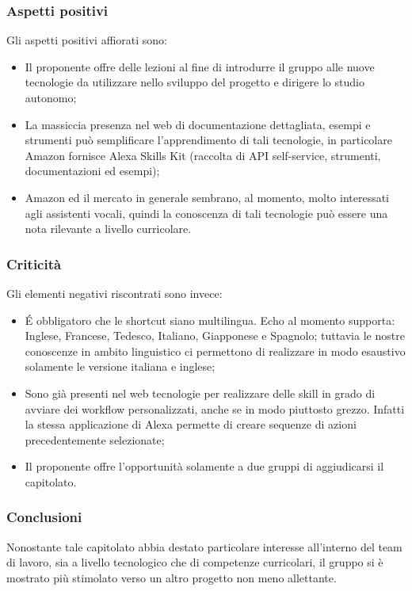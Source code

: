 \subsubsection{Aspetti positivi}
Gli aspetti positivi affiorati sono:
\begin{itemize}
    \item Il proponente offre delle lezioni al fine di introdurre il gruppo alle 
nuove tecnologie da utilizzare nello sviluppo del progetto e dirigere lo studio 
autonomo;
    \item La massiccia presenza nel web di documentazione dettagliata, esempi e 
strumenti può semplificare l'apprendimento di tali tecnologie, in 
particolare Amazon fornisce Alexa Skills Kit (raccolta di API self-service, 
strumenti, documentazioni ed esempi);
    \item Amazon ed il mercato in generale sembrano, al momento, molto interessati 
agli assistenti vocali, quindi la conoscenza di tali tecnologie può essere una 
nota rilevante a livello curricolare.
\end{itemize}
\subsubsection{Criticità}
Gli elementi negativi riscontrati sono invece:
\begin{itemize}
    \item É obbligatoro che le shortcut siano multilingua. Echo al momento 
supporta: Inglese, Francese, Tedesco, Italiano, Giapponese e Spagnolo; tuttavia 
le nostre conoscenze in ambito linguistico ci permettono di realizzare in modo 
esaustivo solamente le versione italiana e inglese;
    \item Sono già presenti nel web tecnologie per realizzare delle skill in 
    grado di avviare dei workflow personalizzati, anche se in modo piuttosto grezzo.
    Infatti la stessa applicazione di Alexa permette di creare sequenze di azioni precedentemente 
selezionate;
    \item Il proponente offre l'opportunità solamente a due gruppi di 
aggiudicarsi il capitolato.
\end{itemize}
\subsubsection{Conclusioni}
Nonostante tale capitolato abbia destato particolare interesse all'interno del 
team di lavoro, sia a livello tecnologico che di competenze curricolari, il 
gruppo si è mostrato più stimolato verso un altro progetto non meno allettante.


